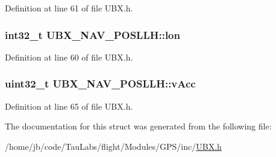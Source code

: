 \-Definition at line 61 of file \-U\-B\-X.\-h.

\hypertarget{struct_u_b_x___n_a_v___p_o_s_l_l_h_a754c2e4fe17d3fc6b627416bc1ff2110}{
\subsubsection[{lon}]{\setlength{\rightskip}{0pt plus 5cm}int32\-\_\-t {\bf \-U\-B\-X\-\_\-\-N\-A\-V\-\_\-\-P\-O\-S\-L\-L\-H\-::lon}}}\label{struct_u_b_x___n_a_v___p_o_s_l_l_h_a754c2e4fe17d3fc6b627416bc1ff2110}


\-Definition at line 60 of file \-U\-B\-X.\-h.

\hypertarget{struct_u_b_x___n_a_v___p_o_s_l_l_h_acd74a5379c0196b551432578f7ef6e4f}{
\subsubsection[{v\-Acc}]{\setlength{\rightskip}{0pt plus 5cm}uint32\-\_\-t {\bf \-U\-B\-X\-\_\-\-N\-A\-V\-\_\-\-P\-O\-S\-L\-L\-H\-::v\-Acc}}}\label{struct_u_b_x___n_a_v___p_o_s_l_l_h_acd74a5379c0196b551432578f7ef6e4f}


\-Definition at line 65 of file \-U\-B\-X.\-h.



\-The documentation for this struct was generated from the following file\-:\begin{DoxyCompactItemize}
\item 
/home/jb/code/\-Tau\-Labs/flight/\-Modules/\-G\-P\-S/inc/\hyperlink{_u_b_x_8h}{\-U\-B\-X.\-h}\end{DoxyCompactItemize}
